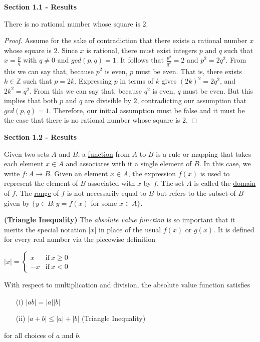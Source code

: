 \documentclass[11pt]{article}
\newcommand{\mytitlecompact}[1]{{

\hfill
{\Large \sffamily \bfseries{#1}}
\hfill
}}
\def\Z{{\mathbb{Z}}}
\newenvironment{thm}[1]
    {\renewcommand\theinnercustomthm{#1}\innercustomthm}
    {\endinnercustomthm}
\newenvironment{defn}[1]
    {\renewcommand\theinnercustomdefn{#1}\innercustomdefn\upshape}
    {\endinnercustomdefn}
\newenvironment{exmp}[1]
    {\renewcommand\theinnercustomexmp{#1}\innercustomexmp\upshape}
    {\endinnercustomexmp}
\begin{document}
\mytitlecompact{Section 1.1 - Results}

\begin{thm}{1.1.1}
    There is no rational number whose square is 2.
\end{thm}
\begin{proof}
    Assume for the sake of contradiction that there exists a rational number $x$ whose square is $2$. Since $x$ is rational, there must exist integers $p$ and $q$ such that $x=\frac{p}{q}$ with $q\neq0$ and $gcd(p,q)=1$. It follows that $\frac{p^2}{q^2}=2$ and $p^2=2q^2$. From this we can say that, because $p^2$ is even, $p$ must be even. That is, there exists $k\in\Z$ such that $p=2k$. Expressing $p$ in terms of $k$ gives $(2k)^2=2q^2$, and $2k^2=q^2$. From this we can say that, because $q^2$ is even, $q$ must be even. But this implies that both $p$ and $q$ are divisible by $2$, contradicting our assumption that $gcd(p,q)=1$. Therefore, our initial assumption must be false and it must be the case that there is no rational number whose square is $2$.
\end{proof}

\mytitlecompact{Section 1.2 - Results}

\begin{defn}{1.2.3} 
    Given two sets $A$ and $B$, a \underline{function} from $A$ to $B$ is a rule or mapping that takes each element $x\in A$ and associates with it a single element of $B$. In this case, we write $f:A\to B$. Given an element $x\in A$, the expression $f(x)$ is used to represent the element of $B$ associated with $x$ by $f$. The set $A$ is called the \underline{domain} of $f$. The \underline{range} of $f$ is not necessarily equal to $B$ but refers to the subset of $B$ given by $\{y\in B:y=f(x)$ for some $x\in A\}$.
\end{defn}

\begin{exmp}{1.2.5} \textbf{(Triangle Inequality)} The \emph{absolute value function} is so important that it merits the special notation $|x|$ in place of the usual $f(x)$ or $g(x)$. It is defined for every real number via the piecewise definition
\begin{center}
    $|x|=
    \begin{cases}
        x & \text{if}~x\geq 0 \\
        -x & \text{if}~x<0
    \end{cases}
    $
\end{center}
With respect to multiplication and division, the absolute value function satisfies
\begin{enumerate}
    \item[(i)] $|ab|=|a||b|$
    \item[(ii)] $|a+b|\leq |a|+|b|$ (Triangle Inequality)
\end{enumerate}
for all choices of $a$ and $b$.
\end{exmp}
\end{document}
